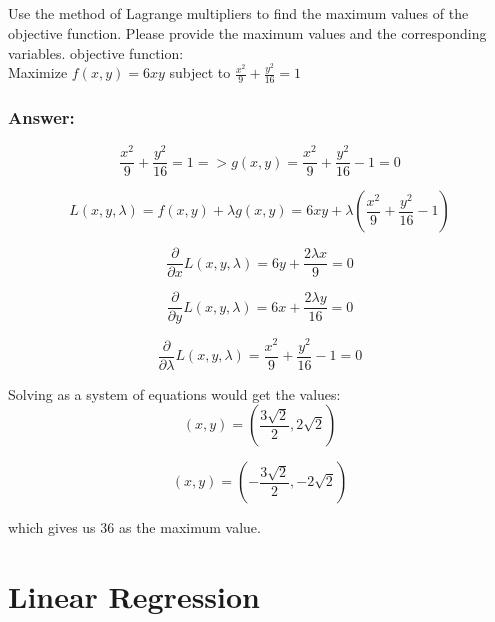 \documentclass{article}
\begin{document}
\subsection{}
Use the method of Lagrange multipliers to find the maximum values of the objective function. Please provide the maximum values and the corresponding variables.
objective function:
\\
Maximize $f(x,y) = 6xy$ subject to $\frac{x^2}{9}+ \frac{y^2}{16} = 1$

\subsubsection{Answer:}

\begin{equation}
    \frac{x^2}{9}+ \frac{y^2}{16} = 1 => g(x,y) = \frac{x^2}{9}+ \frac{y^2}{16} - 1 = 0
\end{equation}

\begin{equation}
    L(x,y,\lambda) = f(x,y) + \lambda g(x,y) = 6xy + \lambda(\frac{x^2}{9}+ \frac{y^2}{16} - 1)
\end{equation}

\begin{equation}
    \frac{\partial}{\partial x} L(x,y,\lambda) = 6y + \frac{{2\lambda}{x}}{9} = 0
\end{equation}

\begin{equation}
    \frac{\partial}{\partial y} L(x,y,\lambda) = 6x + \frac{{2\lambda}{y}}{16} = 0
\end{equation}

\begin{equation}
    \frac{\partial}{\partial \lambda} L(x,y,\lambda) = \frac{x^2}{9}+ \frac{y^2}{16} - 1 = 0
\end{equation}

Solving as a system of equations would get the values:
\begin{equation}
    (x,y) = ( \frac{3\sqrt{2}}{2},  2\sqrt{2})
\end{equation}

\begin{equation}
    (x,y) = ( - \frac{3\sqrt{2}}{2},  - 2\sqrt{2})
\end{equation}

which gives us 36 as the maximum value.

\section{Linear Regression}
\end{document}

